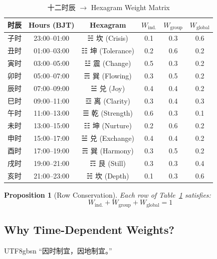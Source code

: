 \documentclass[conference]{IEEEtran}
\newtheorem{proposition}{Proposition}
\begin{document}
\begin{table}[t]
\centering
\caption{十二时辰 $\to$ Hexagram Weight Matrix}
\label{tab:hexagram}
\renewcommand{\arraystretch}{1.2}
\begin{tabular}{lccccc}
\toprule
\textbf{时辰} & \textbf{Hours (BJT)}
  & \textbf{Hexagram}
  & $W_{\text{ind.}}$
  & $W_{\text{group}}$
  & $W_{\text{global}}$ \\
\midrule
子时 & 23:00--01:00 & ☵ 坎 (Crisis)   & 0.1 & 0.3 & 0.6 \\
丑时 & 01:00--03:00 & ☷ 坤 (Tolerance) & 0.2 & 0.6 & 0.2 \\
寅时 & 03:00--05:00 & ☳ 震 (Change)    & 0.5 & 0.3 & 0.2 \\
卯时 & 05:00--07:00 & ☴ 巽 (Flowing)   & 0.3 & 0.5 & 0.2 \\
辰时 & 07:00--09:00 & ☱ 兑 (Joy)       & 0.4 & 0.4 & 0.2 \\
巳时 & 09:00--11:00 & ☲ 离 (Clarity)   & 0.3 & 0.4 & 0.3 \\
午时 & 11:00--13:00 & ☰ 乾 (Strength)  & 0.6 & 0.3 & 0.1 \\
未时 & 13:00--15:00 & ☷ 坤 (Nurture)   & 0.2 & 0.6 & 0.2 \\
申时 & 15:00--17:00 & ☱ 兑 (Exchange)  & 0.4 & 0.4 & 0.2 \\
酉时 & 17:00--19:00 & ☴ 巽 (Harmony)   & 0.3 & 0.5 & 0.2 \\
戌时 & 19:00--21:00 & ☶ 艮 (Still)     & 0.3 & 0.3 & 0.4 \\
亥时 & 21:00--23:00 & ☵ 坎 (Depth)     & 0.1 & 0.3 & 0.6 \\
\bottomrule
\end{tabular}
\end{table}

\begin{proposition}[Row Conservation]
Each row of Table~\ref{tab:hexagram} satisfies:
\begin{equation}
  W_{\text{ind.}} + W_{\text{group}}
  + W_{\text{global}} = 1
  \label{eq:row-sum}
\end{equation}
\end{proposition}

\subsection{Why Time-Dependent Weights?}

\begin{CJK}{UTF8}{gbsn}
``因时制宜，因地制宜。''
\end{CJK}
\end{document}
